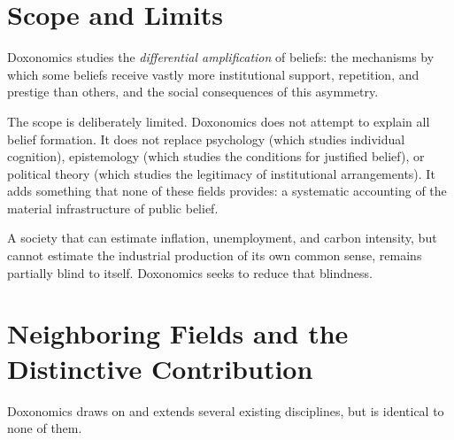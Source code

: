 \section{Scope and Limits}
\label{sec:ch1-scope}

\begin{principle}
\label{prin:scope}
Doxonomics studies the \emph{differential amplification} of beliefs: the mechanisms by which some beliefs receive vastly more institutional support, repetition, and prestige than others, and the social consequences of this asymmetry.
\end{principle}

The scope is deliberately limited.
Doxonomics does not attempt to explain all belief formation.
It does not replace psychology (which studies individual cognition), epistemology (which studies the conditions for justified belief), or political theory (which studies the legitimacy of institutional arrangements).
It adds something that none of these fields provides: a systematic accounting of the material infrastructure of public belief.

A society that can estimate inflation, unemployment, and carbon intensity, but cannot estimate the industrial production of its own common sense, remains partially blind to itself.
Doxonomics seeks to reduce that blindness.


\section{Neighboring Fields and the Distinctive Contribution}
\label{sec:ch1-neighbors}

Doxonomics draws on and extends several existing disciplines, but is identical to none of them.

